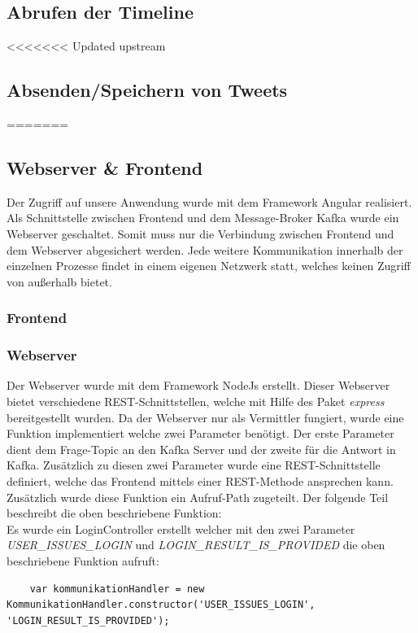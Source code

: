 \subsection{Abrufen der Timeline}

<<<<<<< Updated upstream
\subsection{Absenden/Speichern von Tweets}
=======
\subsection{Webserver & Frontend}
Der Zugriff auf unsere Anwendung wurde mit dem Framework Angular realisiert. Als Schnittstelle zwischen Frontend und dem Message-Broker Kafka wurde ein Webserver geschaltet. Somit muss nur die Verbindung zwischen Frontend und dem Webserver abgesichert werden. Jede weitere Kommunikation innerhalb der einzelnen Prozesse findet in einem eigenen Netzwerk statt, welches keinen Zugriff von außerhalb bietet. 

\subsubsection{Frontend}

\subsubsection{Webserver}
Der Webserver wurde mit dem Framework NodeJs erstellt. Dieser Webserver bietet verschiedene REST-Schnittstellen, welche mit Hilfe des Paket \textit{express} bereitgestellt wurden. Da der Webserver nur als Vermittler fungiert, wurde eine Funktion implementiert welche zwei Parameter benötigt. Der erste Parameter dient dem Frage-Topic an den Kafka Server und der zweite für die Antwort in Kafka. Zusätzlich zu diesen zwei Parameter wurde eine REST-Schnittstelle definiert, welche das Frontend mittels einer REST-Methode ansprechen kann. Zusätzlich wurde diese Funktion ein Aufruf-Path zugeteilt. Der folgende Teil beschreibt die oben beschriebene Funktion: \\

Es wurde ein LoginController erstellt welcher mit den zwei Parameter \textit{USER\_ISSUES\_LOGIN} und \textit{LOGIN\_RESULT\_IS\_PROVIDED} die oben beschriebene Funktion aufruft: \\

\begin{lstlisting}
	var kommunikationHandler = new KommunikationHandler.constructor('USER_ISSUES_LOGIN', 'LOGIN_RESULT_IS_PROVIDED');
\end{lstlisting}

